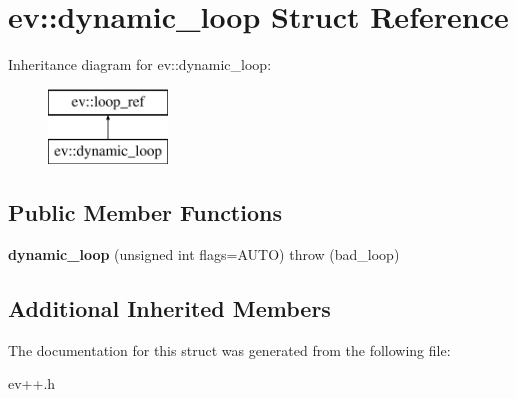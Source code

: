 \hypertarget{structev_1_1dynamic__loop}{}\section{ev\+:\+:dynamic\+\_\+loop Struct Reference}
\label{structev_1_1dynamic__loop}
Inheritance diagram for ev\+:\+:dynamic\+\_\+loop\+:\begin{figure}[H]
\begin{center}
\leavevmode
\includegraphics[height=2.000000cm]{structev_1_1dynamic__loop}
\end{center}
\end{figure}
\subsection*{Public Member Functions}
\begin{DoxyCompactItemize}
\item 
\hypertarget{structev_1_1dynamic__loop_ad3d80ce9aef32427a197b4bf8f9a5ca6}{}\label{structev_1_1dynamic__loop_ad3d80ce9aef32427a197b4bf8f9a5ca6} 
{\bfseries dynamic\+\_\+loop} (unsigned int flags=A\+U\+TO)  throw (bad\+\_\+loop)
\end{DoxyCompactItemize}
\subsection*{Additional Inherited Members}


The documentation for this struct was generated from the following file\+:\begin{DoxyCompactItemize}
\item 
ev++.\+h\end{DoxyCompactItemize}
